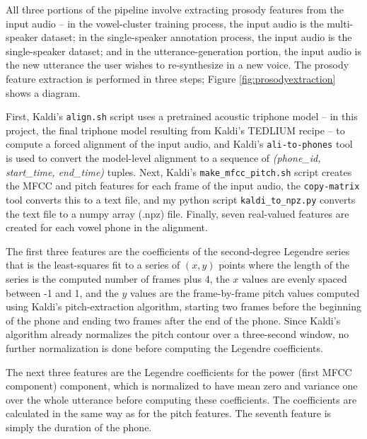 \documentclass{article}
\begin{document}
All three portions of the pipeline involve extracting prosody features from the input audio -- in the vowel-cluster training process, the input audio is the multi-speaker dataset; in the single-speaker annotation process, the input audio is the single-speaker dataset; and in the utterance-generation portion, the input audio is the new utterance the user wishes to re-synthesize in a new voice.
The prosody feature extraction is performed in three steps; Figure \ref{fig:prosodyextraction} shows a diagram.

First, Kaldi's \texttt{align.sh} script uses a pretrained acoustic triphone model -- in this project, the final triphone model resulting from Kaldi's TEDLIUM recipe -- to compute a forced alignment of the input audio, and Kaldi's \texttt{ali-to-phones} tool is used to convert the model-level alignment to a sequence of \textit{(phone\_id, start\_time, end\_time)} tuples.
Next, Kaldi's \texttt{make\_mfcc\_pitch.sh} script creates the MFCC and pitch features for each frame of the input audio, the \texttt{copy-matrix} tool converts this to a text file, and my python script \texttt{kaldi\_to\_npz.py} converts the text file to a numpy array (.npz) file.
Finally, seven real-valued features are created for each vowel phone in the alignment.

The first three features are the coefficients of the second-degree Legendre series that is the least-squares fit to a series of $(x, y)$ points where the length of the series is the computed number of frames plus 4, the $x$ values are evenly spaced between -1 and 1, and the $y$ values are the frame-by-frame pitch values computed using Kaldi's pitch-extraction algorithm, starting two frames before the beginning of the phone and ending two frames after the end of the phone.
Since Kaldi's algorithm already normalizes the pitch contour over a three-second window, no further normalization is done before computing the Legendre coefficients.


The next three features are the Legendre coefficients for the power (first MFCC component) component, which is normalized to have mean zero and variance one over the whole utterance before computing these coefficients. The coefficients are calculated in the same way as for the pitch features.
The seventh feature is simply the duration of the phone.
\end{document}

